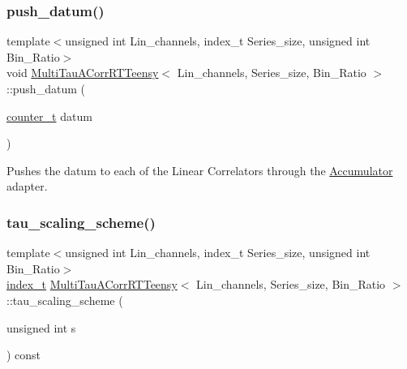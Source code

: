 \mbox{\label{classMultiTauACorrRTTeensy_a85777a221b7a15de34b252ed804ab0f8}} 
\subsubsection{\texorpdfstring{push\+\_\+datum()}{push\_datum()}}
{\footnotesize\ttfamily template$<$unsigned int Lin\+\_\+channels, index\+\_\+t Series\+\_\+size, unsigned int Bin\+\_\+\+Ratio$>$ \\
void \hyperlink{classMultiTauACorrRTTeensy}{Multi\+Tau\+A\+Corr\+R\+T\+Teensy}$<$ Lin\+\_\+channels, Series\+\_\+size, Bin\+\_\+\+Ratio $>$\+::push\+\_\+datum (\begin{DoxyParamCaption}\item[{\hyperlink{types_8hpp_a22f279793847eba127de149437848c48}{counter\+\_\+t}}]{datum }\end{DoxyParamCaption})\hspace{0.3cm}{\ttfamily [inline]}}



Pushes the datum to each of the Linear Correlators through the \hyperlink{classAccumulator}{Accumulator} adapter. 

\mbox{\label{classMultiTauACorrRTTeensy_a1a677c901b40aecdd00a4f2135d8c2bb}} 
\subsubsection{\texorpdfstring{tau\+\_\+scaling\+\_\+scheme()}{tau\_scaling\_scheme()}}
{\footnotesize\ttfamily template$<$unsigned int Lin\+\_\+channels, index\+\_\+t Series\+\_\+size, unsigned int Bin\+\_\+\+Ratio$>$ \\
\hyperlink{types_8hpp_ab41b824af8e088d090c0b9e60f536c9d}{index\+\_\+t} \hyperlink{classMultiTauACorrRTTeensy}{Multi\+Tau\+A\+Corr\+R\+T\+Teensy}$<$ Lin\+\_\+channels, Series\+\_\+size, Bin\+\_\+\+Ratio $>$\+::tau\+\_\+scaling\+\_\+scheme (\begin{DoxyParamCaption}\item[{unsigned int}]{s }\end{DoxyParamCaption}) const\hspace{0.3cm}{\ttfamily [inline]}}




